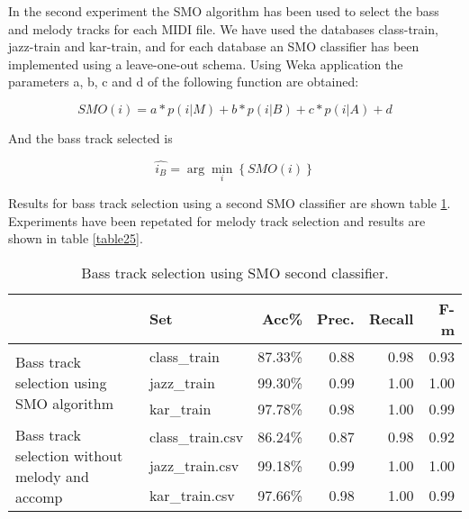 \documentclass{article}
\begin{document}
In the second experiment the SMO algorithm has been used to select the bass and melody tracks for each MIDI file. We have used the databases class-train, jazz-train and kar-train, and for each database an SMO classifier has been implemented using a leave-one-out schema. Using Weka application the parameters a, b, c and d of the following function are obtained:

\begin{equation}
SMO(i) = a*p(i|M) + b*p(i|B) + c*p(i|A) + d    
\end{equation}

And the bass track selected is

\begin{equation}
\hat{i_B}=\arg\min_i\left\{ SMO(i) \right\}
\end{equation}



Results for bass track selection using a second SMO classifier are shown table \ref{table24}. Experiments have been repetated for melody track selection and results are shown in table \ref{table25}.

\begin{table}
\small
\begin{center}
\begin{tabular}{  l | l | r | r | r | r }
\hline
 & Set & Acc\% & Prec. & Recall & F-m \\
\hline
\hline
\multirow{3}{3cm}{Bass track selection using SMO algorithm} & class\_train & 87.33\% & 0.88 & 0.98 & 0.93 \\
 & jazz\_train & 99.30\% & 0.99 & 1.00 & 1.00 \\
 & kar\_train & 97.78\% & 0.98 & 1.00 & 0.99 \\
\hline
\multirow{3}{3cm}{Bass track selection without melody and accomp} & class\_train.csv & 86.24\% & 0.87 & 0.98 & 0.92 \\
 & jazz\_train.csv & 99.18\% & 0.99 & 1.00 & 1.00 \\
 & kar\_train.csv & 97.66\% & 0.98 & 1.00 & 0.99 \\
\hline
\end{tabular}
\caption{Bass track selection using SMO second classifier.}
\label{table24}
\end{center}
\end{table}
\end{document}

